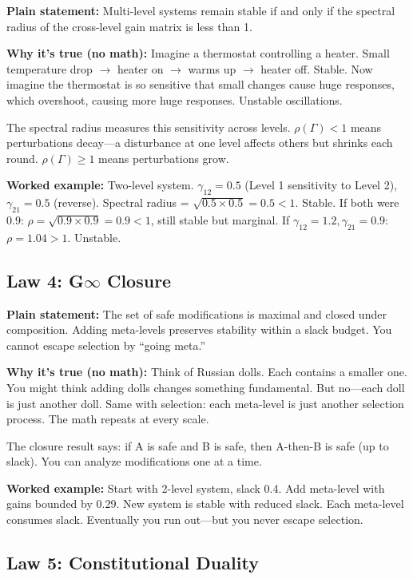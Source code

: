 \documentclass[12pt]{article}
\begin{document}
\textbf{Plain statement:} Multi-level systems remain stable if and only if the spectral radius of the cross-level gain matrix is less than 1.

\textbf{Why it's true (no math):} Imagine a thermostat controlling a heater. Small temperature drop $\to$ heater on $\to$ warms up $\to$ heater off. Stable. Now imagine the thermostat is so sensitive that small changes cause huge responses, which overshoot, causing more huge responses. Unstable oscillations.

The spectral radius measures this sensitivity across levels. $\rho(\Gamma) < 1$ means perturbations decay---a disturbance at one level affects others but shrinks each round. $\rho(\Gamma) \geq 1$ means perturbations grow.

\textbf{Worked example:} Two-level system. $\gamma_{12} = 0.5$ (Level 1 sensitivity to Level 2), $\gamma_{21} = 0.5$ (reverse). Spectral radius = $\sqrt{0.5 \times 0.5} = 0.5 < 1$. Stable. If both were 0.9: $\rho = \sqrt{0.9 \times 0.9} = 0.9 < 1$, still stable but marginal. If $\gamma_{12} = 1.2, \gamma_{21} = 0.9$: $\rho = 1.04 > 1$. Unstable.

\subsection{Law 4: G$\infty$ Closure}

\textbf{Plain statement:} The set of safe modifications is maximal and closed under composition. Adding meta-levels preserves stability within a slack budget. You cannot escape selection by ``going meta.''

\textbf{Why it's true (no math):} Think of Russian dolls. Each contains a smaller one. You might think adding dolls changes something fundamental. But no---each doll is just another doll. Same with selection: each meta-level is just another selection process. The math repeats at every scale.

The closure result says: if A is safe and B is safe, then A-then-B is safe (up to slack). You can analyze modifications one at a time.

\textbf{Worked example:} Start with 2-level system, slack 0.4. Add meta-level with gains bounded by 0.29. New system is stable with reduced slack. Each meta-level consumes slack. Eventually you run out---but you never escape selection.

\subsection{Law 5: Constitutional Duality}
\end{document}
